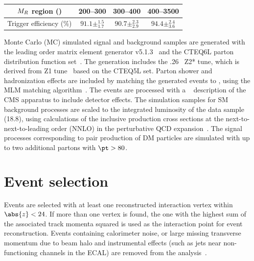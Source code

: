 \begin{table}[htb]
\centering
\begin{tabular}{cccc}
  \hline
  $M_R$ region (\GeVns{}) & 200--300 &  300--400 &
  400--3500 \rule{0pt}{2.3ex} \rule[-1.2ex]{0pt}{0pt}\\
  \hline
  Trigger efficiency (\%) & $91.1\pm ^{1.5}_{1.7}$ &
  $90.7\pm^{2.3}_{2.9}$ & $94.4 \pm ^{2.4}_{3.6}$ \rule{0pt}{2.3ex} \rule[-1.2ex]{0pt}{0pt}\\
  \hline
\end{tabular}
\end{table}

Monte Carlo (MC) simulated signal and background samples are generated with the
leading order matrix element generator {\MADGRAPH
  v5.1.3}~\cite{Alwall:2011uj,Alwall:2014hca} and the CTEQ6L parton
distribution function set~\cite{Pumplin:2002vw}. The generation
includes the .26~\cite{Sjostrand:2006za} Z2* tune, which is
derived from Z1 tune~\cite{Field:2010bc} based on the CTEQ5L set.
Parton shower and hadronization effects are included by matching the generated events to \PYTHIA, using the MLM matching algorithm~\cite{Hoche:2006ph}.
The events are processed with a \GEANTfour~\cite{G4} description of the CMS apparatus to include
detector effects. The simulation samples for SM
background processes are scaled to the
integrated luminosity of the data sample (18.8\fbinv), using
calculations of the inclusive production cross sections at the next-to-next-to-leading
order (NNLO) in the perturbative QCD
expansion~\cite{WatNNLO,ZatNNLO,TTbaratNNLO}.
 The signal processes corresponding to pair production of DM particles
 are simulated with up to two additional partons with $\pt>80$\GeV.



\section{Event selection}\label{sec:selection}

Events are selected with at least one reconstructed
interaction vertex within $\abs{z}<24$\cm. If more than one vertex is
found, the one with the highest sum of the associated track momenta squared is used as the
interaction point for event reconstruction. Events containing
calorimeter noise, or large missing transverse momentum
due to beam halo and instrumental effects (such as jets near
non-functioning channels in the ECAL) are removed from the analysis~\cite{MET_8TeV}.


